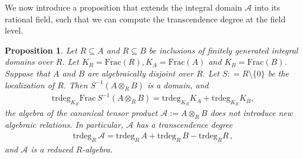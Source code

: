 \documentclass[11pt]{amsart}
\newtheorem{proposition}[theorem]{Proposition}
\theoremstyle{definition}
\theoremstyle{plain}
\theoremstyle{conclusion}
\begin{document}
 
We now introduce a proposition that extends the integral domain $\mathcal{A}$ into its rational field, such that we can compute the transcendence degree at the field level.


 

\begin{proposition}
\label{prop:fieldtoring}
      Let $R \subseteq A$ and $R \subseteq B$ be inclusions of finitely generated integral domains over $ R$. Let $K_R = \mathrm{Frac}(R),K_A = \mathrm{Frac}(A) $ and $K_B = \mathrm{Frac}(B) $. Suppose that $A$ and $B$ are algebraically disjoint over $R$. Let $S : = R\setminus\{0\}$ be the localization of $R$. Then $S^{-1}(A \otimes_R B)$ is a domain, and \begin{align*}
          \mathrm{trdeg}_{K_R} \mathrm{Frac} \, S^{-1}(A \otimes_R B) = \mathrm{trdeg}_{K_R} K_A +  \mathrm{trdeg}_{K_R} K_B ,
      \end{align*}   the algebra of the canonical tensor product $   \mathcal{A}   :=  A\otimes_R B $ does not introduce new algebraic relations. %
      In particular, $\mathcal{A}$ has a transcendence degree  \begin{align*}
   \mathrm{trdeg}_R \, \mathcal{A} = \mathrm{trdeg}_R \, A +  \mathrm{trdeg}_R \, B - \mathrm{trdeg}_R R\,,  
 \end{align*}  and $\mathcal{A}$ is a reduced $R$-algebra.
\end{proposition} 
\end{document}
